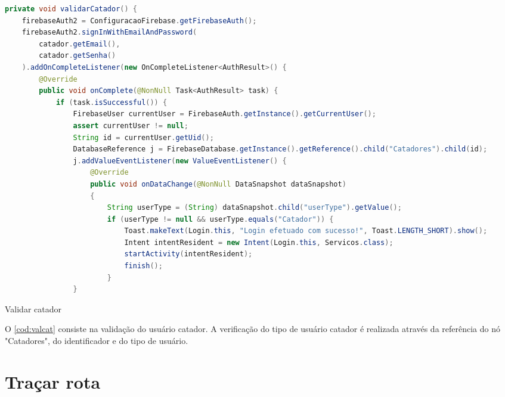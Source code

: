 \begin{codigo}[H]
	\begin{lstlisting}[language=Java]
private void validarCatador() {
    firebaseAuth2 = ConfiguracaoFirebase.getFirebaseAuth();
    firebaseAuth2.signInWithEmailAndPassword(
        catador.getEmail(),
        catador.getSenha()
    ).addOnCompleteListener(new OnCompleteListener<AuthResult>() {
        @Override
        public void onComplete(@NonNull Task<AuthResult> task) {
            if (task.isSuccessful()) {
                FirebaseUser currentUser = FirebaseAuth.getInstance().getCurrentUser();
                assert currentUser != null;
                String id = currentUser.getUid();
                DatabaseReference j = FirebaseDatabase.getInstance().getReference().child("Catadores").child(id);
                j.addValueEventListener(new ValueEventListener() {
                    @Override
                    public void onDataChange(@NonNull DataSnapshot dataSnapshot)
                    {
                        String userType = (String) dataSnapshot.child("userType").getValue();
                        if (userType != null && userType.equals("Catador")) {
                            Toast.makeText(Login.this, "Login efetuado com sucesso!", Toast.LENGTH_SHORT).show();
                            Intent intentResident = new Intent(Login.this, Servicos.class);
                            startActivity(intentResident);
                            finish();
                        }
                }
    	\end{lstlisting}
    	\caption{Validar catador}
    	\label{cod:valcat}
\end{codigo}

O \autoref{cod:valcat} consiste na validação do usuário catador. A verificação do tipo de usuário catador é realizada através da referência do nó "Catadores", do identificador e do tipo de usuário.

\section{Traçar rota}

